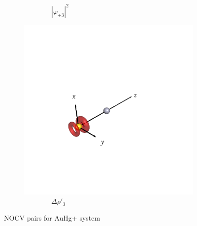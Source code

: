 \documentclass[journal=inoraj,manuscript=article]{achemso}
\begin{document}
\begin{figure}[!h]
\begin{subfigure}[t]{0.30\textwidth}
        \caption*{\ \ \ \ \ \ \ \ $|\varphi_{+3}|^2$} 
    \end{subfigure}
    \hfill
    \begin{subfigure}[t]{0.30\textwidth}
        \centering
        \includegraphics[width=\linewidth]{./AuHg+/pair5.png} 
        \caption*{\ \ \ \ \ \ \ \ $\Delta \rho'_3$} 
    \end{subfigure}

\caption{NOCV pairs for AuHg+ system}
\end{figure}
\end{document}
